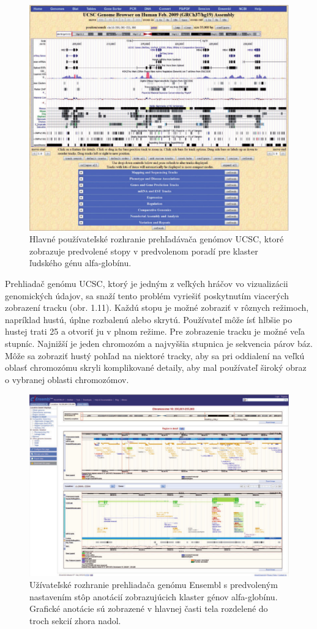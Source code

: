 \begin{figure}[!ht]
	\centering
	\includegraphics[width=.9\textwidth]{figures/ucsc_gb.png}
	\caption{Hlavné používateľské rozhranie prehľadávača genómov UCSC, ktoré zobrazuje predvolené stopy v predvolenom poradí pre klaster ľudského génu alfa-globínu.\label{o:latex_friendly_zone}}
\end{figure}

Prehliadač genómu UCSC, ktorý je jedným z veľkých hráčov vo vizualizácii genomických údajov, sa snaží tento problém vyriešiť poskytnutím viacerých zobrazení tracku (obr. 1.11).
Každú stopu je možné zobraziť v rôznych režimoch, napríklad hustú, úplne rozbalenú alebo skrytú.
Používateľ môže ísť hlbšie po hustej trati 25 a otvoriť ju v plnom režime.
Pre zobrazenie tracku je možné veľa stupníc.
Najnižší je jeden chromozóm a najvyššia stupnica je sekvencia párov báz.
Môže sa zobraziť hustý pohľad na niektoré tracky, aby sa pri oddialení na veľkú oblasť chromozómu skryli komplikované detaily, aby mal používateľ široký obraz o vybranej oblasti chromozómov.

\begin{figure}[!ht]
	\centering
	\includegraphics[width=.9\textwidth]{figures/ensembl_gb.png}
	\caption{Užívateľské rozhranie prehliadača genómu Ensembl s predvoleným nastavením stôp anotácií zobrazujúcich klaster génov alfa-globínu. Grafické anotácie sú zobrazené v hlavnej časti tela rozdelené do troch sekcií zhora nadol.\label{o:latex_friendly_zone}}
\end{figure}

